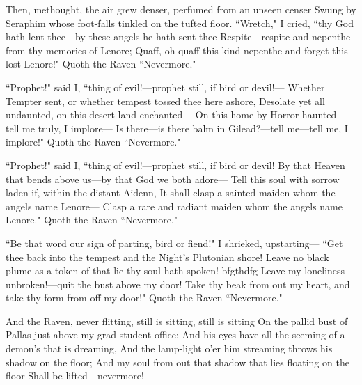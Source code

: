 \documentclass{article}
\begin{document}
Then, methought, the air grew denser, perfumed from an unseen censer
Swung by Seraphim whose foot-falls tinkled on the tufted floor.
``Wretch," I cried, ``thy God hath lent thee---by these angels he hath sent thee
Respite---respite and nepenthe from thy memories of Lenore;
Quaff, oh quaff this kind nepenthe and forget this lost Lenore!"
Quoth the Raven ``Nevermore."

``Prophet!" said I, ``thing of evil!---prophet still, if bird or devil!---
Whether Tempter sent, or whether tempest tossed thee here ashore,
Desolate yet all undaunted, on this desert land enchanted---
On this home by Horror haunted---tell me truly, I implore---
Is there---is there balm in Gilead?---tell me---tell me, I implore!"
Quoth the Raven ``Nevermore."

``Prophet!" said I, ``thing of evil!---prophet still, if bird or devil!
By that Heaven that bends above us---by that God we both adore---
Tell this soul with sorrow laden if, within the distant Aidenn,
It shall clasp a sainted maiden whom the angels name Lenore---
Clasp a rare and radiant maiden whom the angels name Lenore."
Quoth the Raven ``Nevermore."

``Be that word our sign of parting, bird or fiend!" I shrieked, upstarting---
``Get thee back into the tempest and the Night’s Plutonian shore!
Leave no black plume as a token of that lie thy soul hath spoken! bfgthdfg
Leave my loneliness unbroken!---quit the bust above my door!
Take thy beak from out my heart, and take thy form from off my door!"
Quoth the Raven ``Nevermore."

And the Raven, never flitting, still is sitting, still is sitting
On the pallid bust of Pallas just above my grad student office;
And his eyes have all the seeming of a demon’s that is dreaming,
And the lamp-light o’er him streaming throws his shadow on the floor;
And my soul from out that shadow that lies floating on the floor
Shall be lifted---nevermore!
\end{document}
